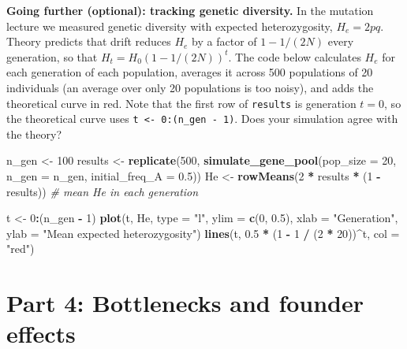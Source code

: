 \documentclass[
  a4paper]{book}
\newenvironment{Shaded}{\begin{snugshade}}{\end{snugshade}}
\newcommand{\AttributeTok}[1]{\textcolor[rgb]{0.13,0.29,0.53}{#1}}
\newcommand{\CommentTok}[1]{\textcolor[rgb]{0.56,0.35,0.01}{\textit{#1}}}
\newcommand{\DecValTok}[1]{\textcolor[rgb]{0.00,0.00,0.81}{#1}}
\newcommand{\FloatTok}[1]{\textcolor[rgb]{0.00,0.00,0.81}{#1}}
\newcommand{\FunctionTok}[1]{\textcolor[rgb]{0.13,0.29,0.53}{\textbf{#1}}}
\newcommand{\NormalTok}[1]{#1}
\newcommand{\OtherTok}[1]{\textcolor[rgb]{0.56,0.35,0.01}{#1}}
\newcommand{\SpecialCharTok}[1]{\textcolor[rgb]{0.81,0.36,0.00}{\textbf{#1}}}
\newcommand{\StringTok}[1]{\textcolor[rgb]{0.31,0.60,0.02}{#1}}
\begin{document}
\textbf{Going further (optional): tracking genetic diversity.} In the mutation lecture we measured genetic diversity with expected heterozygosity, \(H_e = 2pq\). Theory predicts that drift reduces \(H_e\) by a factor of \(1 - 1/(2N)\) every generation, so that \(H_t = H_0 (1 - 1/(2N))^t\). The code below calculates \(H_e\) for each generation of each population, averages it across 500 populations of 20 individuals (an average over only 20 populations is too noisy), and adds the theoretical curve in red. Note that the first row of \texttt{results} is generation \(t = 0\), so the theoretical curve uses \texttt{t\ \textless{}-\ 0:(n\_gen\ -\ 1)}. Does your simulation agree with the theory?

\begin{Shaded}
\begin{Highlighting}[]
\NormalTok{n\_gen }\OtherTok{\textless{}{-}} \DecValTok{100}
\NormalTok{results }\OtherTok{\textless{}{-}} \FunctionTok{replicate}\NormalTok{(}\DecValTok{500}\NormalTok{, }\FunctionTok{simulate\_gene\_pool}\NormalTok{(}\AttributeTok{pop\_size =} \DecValTok{20}\NormalTok{, }\AttributeTok{n\_gen =}\NormalTok{ n\_gen,}
                                             \AttributeTok{initial\_freq\_A =} \FloatTok{0.5}\NormalTok{))}
\NormalTok{He }\OtherTok{\textless{}{-}} \FunctionTok{rowMeans}\NormalTok{(}\DecValTok{2} \SpecialCharTok{*}\NormalTok{ results }\SpecialCharTok{*}\NormalTok{ (}\DecValTok{1} \SpecialCharTok{{-}}\NormalTok{ results))   }\CommentTok{\# mean He in each generation}

\NormalTok{t }\OtherTok{\textless{}{-}} \DecValTok{0}\SpecialCharTok{:}\NormalTok{(n\_gen }\SpecialCharTok{{-}} \DecValTok{1}\NormalTok{)}
\FunctionTok{plot}\NormalTok{(t, He, }\AttributeTok{type =} \StringTok{"l"}\NormalTok{, }\AttributeTok{ylim =} \FunctionTok{c}\NormalTok{(}\DecValTok{0}\NormalTok{, }\FloatTok{0.5}\NormalTok{),}
     \AttributeTok{xlab =} \StringTok{"Generation"}\NormalTok{, }\AttributeTok{ylab =} \StringTok{"Mean expected heterozygosity"}\NormalTok{)}
\FunctionTok{lines}\NormalTok{(t, }\FloatTok{0.5} \SpecialCharTok{*}\NormalTok{ (}\DecValTok{1} \SpecialCharTok{{-}} \DecValTok{1} \SpecialCharTok{/}\NormalTok{ (}\DecValTok{2} \SpecialCharTok{*} \DecValTok{20}\NormalTok{))}\SpecialCharTok{\^{}}\NormalTok{t, }\AttributeTok{col =} \StringTok{"red"}\NormalTok{)}
\end{Highlighting}
\end{Shaded}

\section{Part 4: Bottlenecks and founder effects}\label{part-4-bottlenecks-and-founder-effects}
\end{document}
